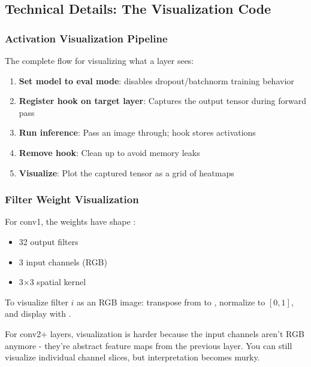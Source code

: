 \documentclass[9pt,a4paper,twocolumn,twoside]{tau-class/tau}
\begin{document}
    \subsection{Technical Details: The Visualization Code}

        \subsubsection{Activation Visualization Pipeline}

        The complete flow for visualizing what a layer sees:

        \begin{enumerate}
            \item \textbf{Set model to eval mode}:  disables dropout/batchnorm training behavior
            \item \textbf{Register hook on target layer}: Captures the output tensor during forward pass
            \item \textbf{Run inference}: Pass an image through; hook stores activations
            \item \textbf{Remove hook}: Clean up to avoid memory leaks
            \item \textbf{Visualize}: Plot the captured tensor as a grid of heatmaps
        \end{enumerate}

        \subsubsection{Filter Weight Visualization}

        For conv1, the weights have shape :
        \begin{itemize}
            \item 32 output filters
            \item 3 input channels (RGB)
            \item 3$\times$3 spatial kernel
        \end{itemize}

        To visualize filter $i$ as an RGB image: transpose from  to , normalize to $[0, 1]$, and display with .

        For conv2+ layers, visualization is harder because the input channels aren't RGB anymore - they're abstract feature maps from the previous layer. You can still visualize individual channel slices, but interpretation becomes murky.
\end{document}
